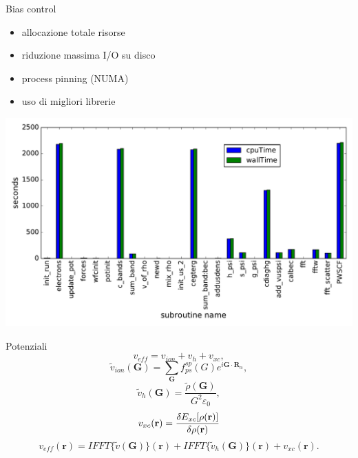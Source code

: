 \documentclass[8pt]{beamer}
\newcommand\mf[1]{\mathbf{#1}}
\newcommand\dens{\rho(\mathbf{r})}
\newcommand\erre{\mathbf{r}}
\begin{document}
\appendix

\begin{frame}{Bias control}
\begin{itemize}
	\item allocazione totale risorse
	\item riduzione massima I/O su disco
	\item process pinning (NUMA)
	\item uso di migliori librerie
\end{itemize}
\begin{center}
	\includegraphics[height=0.5\textheight]{cpuwalltime.pdf}	
\end{center}
\end{frame}


\begin{frame}{Potenziali}
\begin{equation}
	v_{eff} = v_{ion} + v_{h} + v_{xc},
\end{equation}
\begin{equation}
	\tilde{v}_{ion}(\mf{G}) = \sum_{\mf{G}} f_{ps}^{sp}(G) e^{i \mf{G} \cdot \mf{R}_{\alpha}},
\end{equation}
\begin{equation}
	\tilde{v}_{h}(\mf{G}) = \frac{\tilde{\rho}(\mf{G})}{G^2 \varepsilon_{0}},
\end{equation}
\begin{equation}
	v_{xc}(\erre) =	\frac{\var{E_{xc}[\dens]}}{\var{\dens}}
\end{equation}
\begin{equation}
	v_{eff}(\erre) = IFFT\{\tilde{v}(\mf{G})\}(\erre) + IFFT\{\tilde{v}_{h}(\mf{G})\}(\erre) + v_{xc}(\erre).
\end{equation}


\end{frame}
\end{document}
